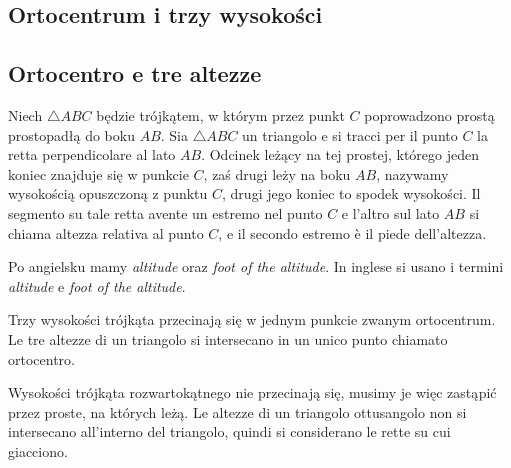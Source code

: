 %

\subsection{Ortocentrum i trzy wysokości} %
\subsection{Ortocentro e tre altezze} %

\begin{definition}
[wysokość] %
[altezza] %
    Niech $\triangle ABC$ będzie trójkątem, w którym przez punkt $C$ poprowadzono prostą prostopadłą do boku $AB$. %
    Sia $\triangle ABC$ un triangolo e si tracci per il punto $C$ la retta perpendicolare al lato $AB$. %
    Odcinek leżący na tej prostej, którego jeden koniec znajduje się w punkcie $C$, zaś drugi leży na boku $AB$, nazywamy wysokością opuszczoną z punktu $C$, drugi jego koniec to spodek wysokości. %
    Il segmento su tale retta avente un estremo nel punto $C$ e l'altro sul lato $AB$ si chiama altezza relativa al punto $C$, e il secondo estremo è il piede dell'altezza. %
\end{definition}

Po angielsku mamy \emph{altitude} oraz \emph{foot of the altitude}. %
In inglese si usano i termini \emph{altitude} e \emph{foot of the altitude}. %


\begin{proposition}
\label{wysokosci_przecinaja_sie}%
	Trzy wysokości trójkąta przecinają się w jednym punkcie zwanym ortocentrum. %
	Le tre altezze di un triangolo si intersecano in un unico punto chiamato ortocentro. %
\end{proposition}

Wysokości trójkąta rozwartokątnego nie przecinają się, musimy je więc zastąpić przez proste, na których leżą. %
Le altezze di un triangolo ottusangolo non si intersecano all'interno del triangolo, quindi si considerano le rette su cui giacciono. %

